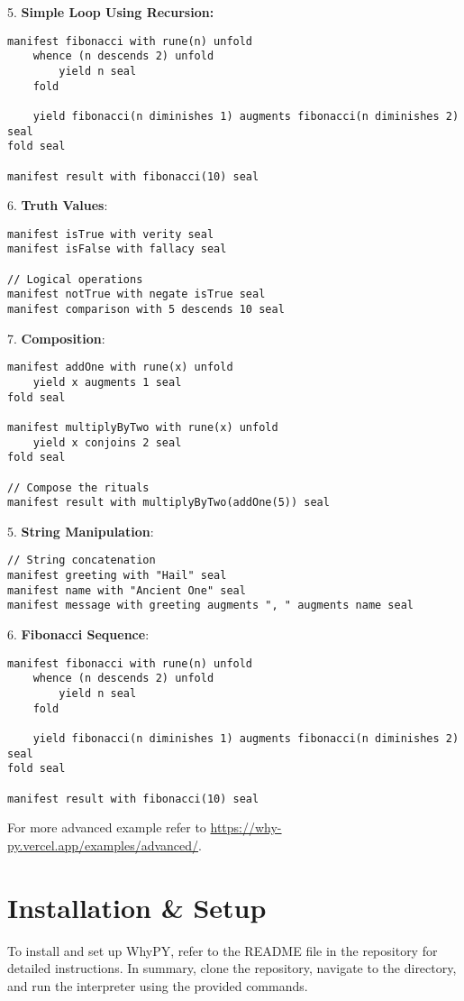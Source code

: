 \documentclass[conference]{IEEEtran}
\begin{document}
5. \textbf{Simple Loop Using Recursion: }
\begin{lstlisting}
manifest fibonacci with rune(n) unfold
    whence (n descends 2) unfold
        yield n seal
    fold

    yield fibonacci(n diminishes 1) augments fibonacci(n diminishes 2) seal
fold seal

manifest result with fibonacci(10) seal
\end{lstlisting}


6. \textbf{Truth Values}:
\begin{lstlisting}
manifest isTrue with verity seal
manifest isFalse with fallacy seal

// Logical operations
manifest notTrue with negate isTrue seal
manifest comparison with 5 descends 10 seal
\end{lstlisting}


7. \textbf{Composition}:
\begin{lstlisting}
manifest addOne with rune(x) unfold
    yield x augments 1 seal
fold seal

manifest multiplyByTwo with rune(x) unfold
    yield x conjoins 2 seal
fold seal

// Compose the rituals
manifest result with multiplyByTwo(addOne(5)) seal
\end{lstlisting}

5. \textbf{String Manipulation}:
\begin{lstlisting}
// String concatenation
manifest greeting with "Hail" seal
manifest name with "Ancient One" seal
manifest message with greeting augments ", " augments name seal

\end{lstlisting}

6. \textbf{Fibonacci Sequence}:
\begin{lstlisting}
manifest fibonacci with rune(n) unfold
    whence (n descends 2) unfold
        yield n seal
    fold

    yield fibonacci(n diminishes 1) augments fibonacci(n diminishes 2) seal
fold seal

manifest result with fibonacci(10) seal
\end{lstlisting}

For more advanced example refer to \url{https://why-py.vercel.app/examples/advanced/}.


\section{Installation \& Setup}
To install and set up WhyPY, refer to the README file in the repository for detailed instructions. In summary, clone the repository, navigate to the directory, and run the interpreter using the provided commands.
\end{document}
